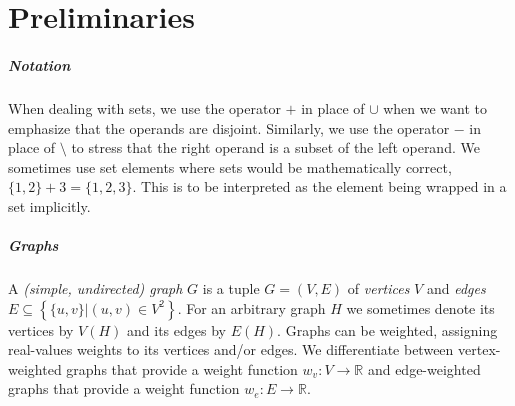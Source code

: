 \chapter{Preliminaries}
\label{chap:preliminaries}





\paragraph{Notation}

When dealing with sets, we use the operator $+$ in place of $\cup$ when we want to emphasize that the operands are disjoint. Similarly, we use the operator $-$ in place of $\setminus$ to stress that the right operand is a subset of the left operand. We sometimes use set elements where sets would be mathematically correct, \eg{} $\{1,2\} + 3 = \{1,2,3\}$. This is to be interpreted as the element being wrapped in a set implicitly.


\paragraph{Graphs}

\begin{definition}
	A \emph{(simple, undirected) graph} $G$ is a tuple $G = (V, E)$ of \emph{vertices} $V$ and \emph{edges} $E \subseteq \left\{\{u,v\} \vert (u,v) \in V^2 \right\}$.
	For an arbitrary graph $H$ we sometimes denote its vertices by $V(H)$ and its edges by $E(H)$.
	Graphs can be weighted, assigning real-values weights to its vertices and/or edges. We differentiate between vertex-weighted graphs that provide a weight function $w_v \colon V \to \mathbb{R}$ and edge-weighted graphs that provide a weight function $w_e \colon E \to \mathbb{R}$.
\end{definition}

